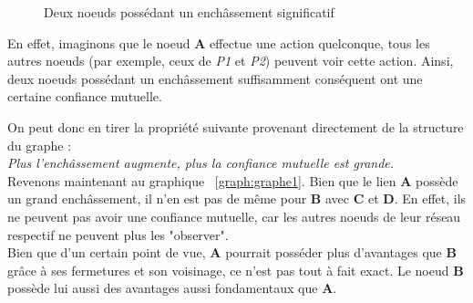 \begin{figure}[h!]
\centering
{}
\caption{Deux noeuds possédant un enchâssement significatif}
\label{graph:graphe2}
\end{figure}

 En effet, imaginons que le noeud \textbf{A} effectue une action quelconque, tous les autres noeuds (par exemple, ceux de \textit{P1} et \textit{P2}) peuvent voir cette action.
Ainsi, deux noeuds possédant un enchâssement suffisamment conséquent ont une certaine confiance mutuelle.

On peut donc en tirer la propriété suivante provenant directement de la structure du graphe : \\

\textit{Plus l'enchâssement augmente, plus la confiance mutuelle est grande.}\\

Revenons maintenant au graphique ~\ref{graph:graphe1}. Bien que le lien \textbf{A} possède un grand enchâssement, il n'en est pas de même pour \textbf{B} avec \textbf{C} et \textbf{D}.
En effet, ils ne peuvent pas avoir une confiance mutuelle, car les autres noeuds de leur réseau respectif ne peuvent plus les "observer".\\

Bien que d'un certain point de vue, \textbf{A} pourrait posséder plus d'avantages que \textbf{B} grâce à ses fermetures et son voisinage, ce n'est pas tout à fait exact. Le noeud \textbf{B} possède lui aussi des avantages aussi fondamentaux que \textbf{A}.\\

